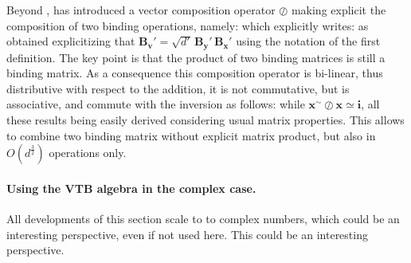 Beyond \cite{gosmann_vector-derived_2019}, \cite{mercier_ontology_2021} has introduced a vector composition operator $\oslash$ making explicit the composition of two binding operations, namely:
which explicitly writes:
as obtained explicitizing that $\mathbf{B_v}' = \sqrt{d'} \,\mathbf{B_y}' \, \mathbf{B_x}'$ using the notation of the first definition. The key point is that the product of two binding matrices is still a binding matrix. As a consequence this composition operator is bi-linear, thus distributive with respect to the addition, it is not commutative, but is associative, and commute with the inversion as follows:
while $\mathbf{x}^\sim \oslash \mathbf{x} \simeq \mathbf{\mathbf{i}}$, all these results being easily derived considering usual matrix properties. This allows to combine two binding matrix without explicit matrix product, but also in $O\left(d^{\frac{3}{2}}\right)$ operations only.

\paragraph{Using the VTB algebra in the complex case.}

All developments of this section scale to to complex numbers, which could be an interesting perspective, even if not used here. This could be an interesting perspective.

